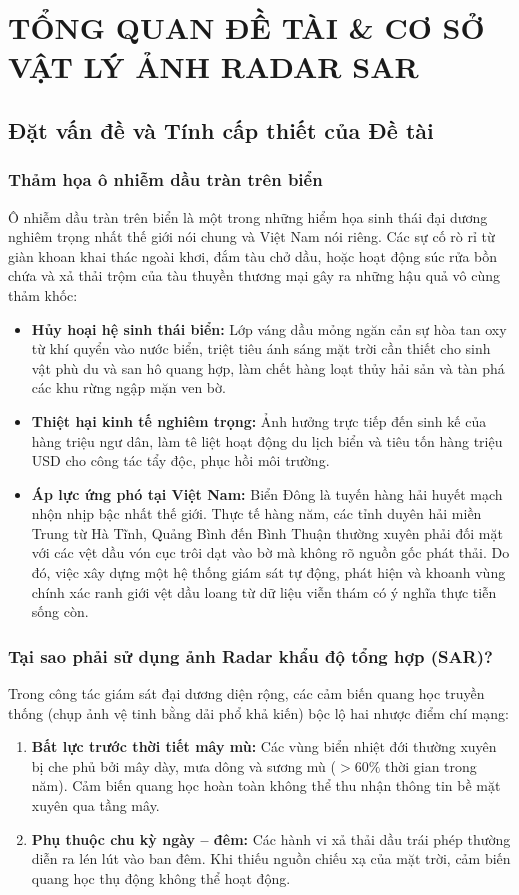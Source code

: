 \chapter{TỔNG QUAN ĐỀ TÀI \& CƠ SỞ VẬT LÝ ẢNH RADAR SAR}
\label{ch:tong_quan}

\section{Đặt vấn đề và Tính cấp thiết của Đề tài}
\subsection{Thảm họa ô nhiễm dầu tràn trên biển}
Ô nhiễm dầu tràn trên biển là một trong những hiểm họa sinh thái đại dương nghiêm trọng nhất thế giới nói chung và Việt Nam nói riêng. Các sự cố rò rỉ từ giàn khoan khai thác ngoài khơi, đắm tàu chở dầu, hoặc hoạt động súc rửa bồn chứa và xả thải trộm của tàu thuyền thương mại gây ra những hậu quả vô cùng thảm khốc:
\begin{itemize}
    \item \textbf{Hủy hoại hệ sinh thái biển:} Lớp váng dầu mỏng ngăn cản sự hòa tan oxy từ khí quyển vào nước biển, triệt tiêu ánh sáng mặt trời cần thiết cho sinh vật phù du và san hô quang hợp, làm chết hàng loạt thủy hải sản và tàn phá các khu rừng ngập mặn ven bờ.
    \item \textbf{Thiệt hại kinh tế nghiêm trọng:} Ảnh hưởng trực tiếp đến sinh kế của hàng triệu ngư dân, làm tê liệt hoạt động du lịch biển và tiêu tốn hàng triệu USD cho công tác tẩy độc, phục hồi môi trường.
    \item \textbf{Áp lực ứng phó tại Việt Nam:} Biển Đông là tuyến hàng hải huyết mạch nhộn nhịp bậc nhất thế giới. Thực tế hàng năm, các tỉnh duyên hải miền Trung từ Hà Tĩnh, Quảng Bình đến Bình Thuận thường xuyên phải đối mặt với các vệt dầu vón cục trôi dạt vào bờ mà không rõ nguồn gốc phát thải. Do đó, việc xây dựng một hệ thống giám sát tự động, phát hiện và khoanh vùng chính xác ranh giới vệt dầu loang từ dữ liệu viễn thám có ý nghĩa thực tiễn sống còn.
\end{itemize}

\subsection{Tại sao phải sử dụng ảnh Radar khẩu độ tổng hợp (SAR)?}
Trong công tác giám sát đại dương diện rộng, các cảm biến quang học truyền thống (chụp ảnh vệ tinh bằng dải phổ khả kiến) bộc lộ hai nhược điểm chí mạng:
\begin{enumerate}
    \item \textbf{Bất lực trước thời tiết mây mù:} Các vùng biển nhiệt đới thường xuyên bị che phủ bởi mây dày, mưa dông và sương mù ($> 60\%$ thời gian trong năm). Cảm biến quang học hoàn toàn không thể thu nhận thông tin bề mặt xuyên qua tầng mây.
    \item \textbf{Phụ thuộc chu kỳ ngày -- đêm:} Các hành vi xả thải dầu trái phép thường diễn ra lén lút vào ban đêm. Khi thiếu nguồn chiếu xạ của mặt trời, cảm biến quang học thụ động không thể hoạt động.
\end{enumerate}

